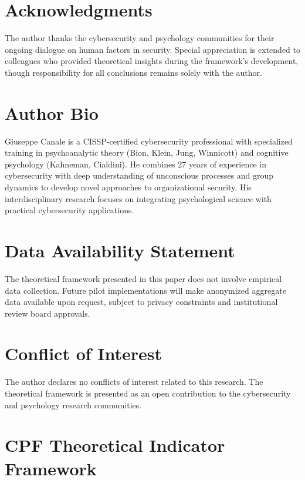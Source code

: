 \documentclass[11pt,a4paper]{article}
\begin{document}
\section*{Acknowledgments}

The author thanks the cybersecurity and psychology communities for their ongoing dialogue on human factors in security. Special appreciation is extended to colleagues who provided theoretical insights during the framework's development, though responsibility for all conclusions remains solely with the author.

\section*{Author Bio}

Giuseppe Canale is a CISSP-certified cybersecurity professional with specialized training in psychoanalytic theory (Bion, Klein, Jung, Winnicott) and cognitive psychology (Kahneman, Cialdini). He combines 27 years of experience in cybersecurity with deep understanding of unconscious processes and group dynamics to develop novel approaches to organizational security. His interdisciplinary research focuses on integrating psychological science with practical cybersecurity applications.

\section*{Data Availability Statement}

The theoretical framework presented in this paper does not involve empirical data collection. Future pilot implementations will make anonymized aggregate data available upon request, subject to privacy constraints and institutional review board approvals.

\section*{Conflict of Interest}

The author declares no conflicts of interest related to this research. The theoretical framework is presented as an open contribution to the cybersecurity and psychology research communities.

\appendix

\section{CPF Theoretical Indicator Framework}
\label{app:framework}
\end{document}
